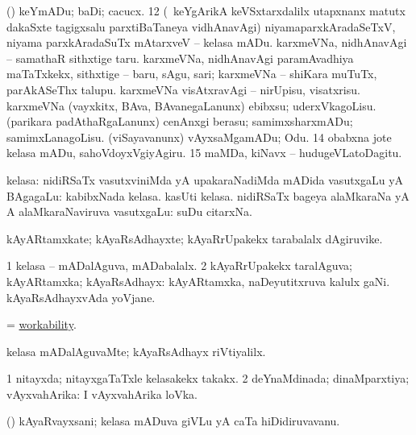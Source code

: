 \begin{center}
 (\AmA) keYmADu; baDi; cacucx. 
\eanum
\numie
\num{12}  (\kanmu\ keYgArikA keVSxtarxdalilx utapxnanx matutx dakaSxte tagigxsalu parxtiBaTaneya vidhAnavAgi) niyamaparxkAradaSeTxV, niyama parxkAradaSuTx mAtarxveV -- kelasa mADu. 
  
\banum
{} karxmeVNa, nidhAnavAgi -- samathaR sithxtige taru. 
 karxmeVNa, nidhAnavAgi paramAvadhiya maTaTxkekx, sithxtige -- baru, sAgu, sari; karxmeVNa -- shiKara muTuTx, parAkASeThx talupu. 
 karxmeVNa visAtxravAgi -- nirUpisu, visatxrisu. 
 karxmeVNa (vayxkitx, BAva, BAvanegaLanunx) ebibxsu; uderxVkagoLisu. 
 (parikara padAthaRgaLanunx) cenAnxgi berasu; samimxsharxmADu; samimxLanagoLisu. 
 (viSayavanunx) vAyxsaMgamADu; Odu. 
\eanum
\numie
\num{14}  obabxna jote kelasa mADu, sahoVdoyxVgiyAgiru. 
\num{15}  maMDa, kiNavx -- hudugeVLatoDagitu. 
\enum
\emng
\eentry

\bentry
{}
\gl{\saupa}
\expl{}
\bmng
kelasa: 
\banum
{} nidiRSaTx vasutxviniMda yA upakaraNadiMda mADida vasutxgaLu yA BAgagaLu:  kabibxNada kelasa.  kasUti kelasa. 
 nidiRSaTx bageya alaMkaraNa yA A alaMkaraNaviruva vasutxgaLu:  suDu citarxNa. 
\eanum
\emng
\eentry

\bentry
{} 
\gl{\nA}
\bmng
kAyARtamxkate; kAyaRsAdhayxte; kAyaRrUpakekx tarabalalx dAgiruvike. 
\emng
\eentry

\bentry
{} 
\gl{\gu}
\expl{}
\bmng
\bnum
\num{1} kelasa -- mADalAguva, mADabalalx. 
\num{2} kAyaRrUpakekx taralAguva; kAyARtamxka; kAyaRsAdhayx:  kAyARtamxka, naDeyutitxruva kalulx gaNi.  kAyaRsAdhayxvAda yoVjane. 
\enum
\emng
\eentry

\bentry
{} 
\gl{\nA}
\expl{}
\bmng
= \hyperlink{workability}{workability}. 
\emng
\eentry

\bentry
{} 
\gl{\kirxvi}
\expl{}
\bmng
kelasa mADalAguvaMte; kAyaRsAdhayx riVtiyalilx. 
\emng
\eentry

\bentry
{} 
\gl{\gu}
\expl{}
\bmng
\bnum
\num{1} nitayxda; nitayxgaTaTxle kelasakekx takakx. 
\num{2} deYnaMdinada; dinaMparxtiya; vAyxvahArika:  I vAyxvahArika loVka. 
\enum
\emng
\eentry

\bentry
{} 
\gl{\nA}
\expl{}
\bmng
(\AmA) kAyaRvayxsani; kelasa mADuva giVLu yA caTa hiDidiruvavanu. 
\emng
\eentry


\end{center}
